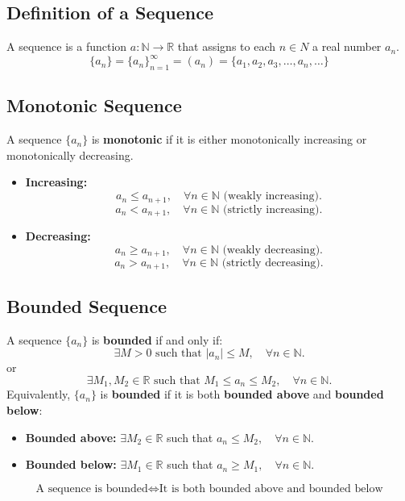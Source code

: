 \documentclass[a4paper,11pt]{article}
\begin{document}


\subsection{Definition of a Sequence}

\begin{tcolorbox}
    A sequence is a function $a: \mathbb{N} \rightarrow \mathbb{R}$ that assigns to each $n \in N$ a real number $a_n$.
    \[
    \{a_n\} = \{a_n\}_{n=1}^{\infty} = (a_n) = \{a_1, a_2, a_3, \dots, a_n, \dots\}
    \]
\end{tcolorbox}




\subsection{Monotonic Sequence}

\begin{tcolorbox}
    A sequence $\{a_n\}$ is \textbf{monotonic} if it is either monotonically increasing or monotonically decreasing.
    \begin{itemize}
        \item \textbf{Increasing:}
        \[ a_n \leq a_{n+1}, \quad \forall n \in \mathbb{N} \text{ (weakly increasing)}. \]
        \[ a_n < a_{n+1}, \quad \forall n \in \mathbb{N} \text{ (strictly increasing)}. \]
        \item \textbf{Decreasing:}
        \[ a_n \geq a_{n+1}, \quad \forall n \in \mathbb{N} \text{ (weakly decreasing)}. \]
        \[ a_n > a_{n+1}, \quad \forall n \in \mathbb{N} \text{ (strictly decreasing)}. \]
    \end{itemize}
\end{tcolorbox}




\subsection{Bounded Sequence}

\begin{tcolorbox}
    A sequence $\{a_n\}$ is \textbf{bounded} if and only if:
    \[
    \exists M > 0 \text{ such that } |a_n| \leq M, \quad \forall n \in \mathbb{N}.
    \]
    or
    \[ 
    \exists M_1, M_2 \in \mathbb{R} \text{ such that } M_1 \leq a_n \leq M_2, \quad \forall n \in \mathbb{N}.
    \]
    Equivalently, $\{a_n\}$ is \textbf{bounded} if it is both \textbf{bounded above} and \textbf{bounded below}:
    \begin{itemize}
        \item \textbf{Bounded above:} $\exists M_2 \in \mathbb{R}$ such that $a_n \leq M_2, \quad \forall n \in \mathbb{N}$.
        \item \textbf{Bounded below:} $\exists M_1 \in \mathbb{R}$ such that $a_n \geq M_1, \quad \forall n \in \mathbb{N}$.
    \end{itemize}
    \[
    \text{A sequence is bounded} \iff \text{It is both bounded above and bounded below}
    \]
\end{tcolorbox}
\end{document}
